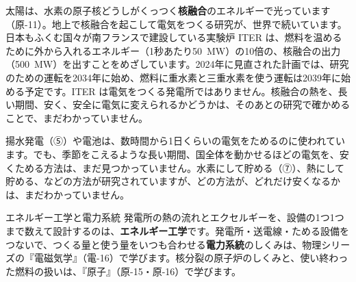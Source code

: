 \begin{phmada}
太陽は、水素の原子核どうしがくっつく\textbf{核融合}のエネルギーで光っています（原-11）。地上で核融合を起こして電気をつくる研究が、世界で続いています。日本もふくむ国々が南フランスで建設している実験炉 ITER は、燃料を温めるために外から入れるエネルギー（1秒あたり\qty{50}{MW}）の10倍の、核融合の出力（\qty{500}{MW}）を出すことをめざしています。2024年に見直された計画では、研究のための運転を2034年に始め、燃料に重水素と三重水素を使う運転は2039年に始める予定です。ITER は電気をつくる発電所ではありません。核融合の熱を、長い期間、安く、安全に電気に変えられるかどうかは、そのあとの研究で確かめることで、まだわかっていません。
\end{phmada}
\begin{phmada}
揚水発電（⑤）や電池は、数時間から1日くらいの電気をためるのに使われています。でも、季節をこえるような長い期間、国全体を動かせるほどの電気を、安くためる方法は、まだ見つかっていません。水素にして貯める（⑦）、熱にして貯める、などの方法が研究されていますが、どの方法が、どれだけ安くなるかは、まだわかっていません。
\end{phmada}
\begin{phsaki}{エネルギー工学と電力系統}
発電所の熱の流れとエクセルギーを、設備の1つ1つまで数えて設計するのは、\textbf{エネルギー工学}です。発電所・送電線・ためる設備をつないで、つくる量と使う量をいつも合わせる\textbf{電力系統}のしくみは、物理シリーズの『電磁気学』（電-16）で学びます。核分裂の原子炉のしくみと、使い終わった燃料の扱いは、『原子』（原-15・原-16）で学びます。
\end{phsaki}

\begin{kotoba}\small
{}
\end{kotoba}


